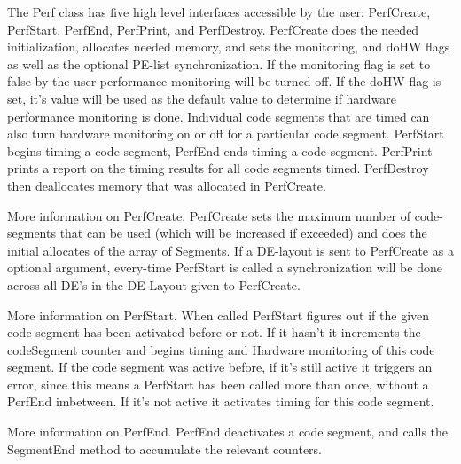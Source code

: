 %


The Perf class has five high level interfaces accessible by the user:
PerfCreate, PerfStart, PerfEnd, PerfPrint, and PerfDestroy. PerfCreate does the needed
initialization, allocates needed memory, and sets the monitoring, and doHW 
flags as well as the optional PE-list synchronization. If the monitoring flag is 
set to false by the user performance monitoring 
will be turned off. If the doHW flag is set, it's value will be used as the 
default value to determine if hardware performance monitoring is done. Individual code
segments that are timed can also turn hardware monitoring on or off for
a particular code segment. PerfStart begins timing a code segment, PerfEnd
ends timing a code segment. PerfPrint prints a report on the timing results
for all code segments timed. PerfDestroy then deallocates memory that was
allocated in PerfCreate.

More information on PerfCreate. PerfCreate sets the maximum number of code-segments
that can be used (which will be increased if exceeded) and does the initial
allocates of the array of Segments. If a DE-layout is sent to PerfCreate as a
optional argument, every-time PerfStart is called a synchronization will be done
across all DE's in the DE-Layout given to PerfCreate.

More information on PerfStart. When called PerfStart figures out if the given
code segment has been activated before or not. If it hasn't it increments
the codeSegment counter and begins timing and Hardware monitoring of this
code segment. If the code segment was active before, if it's still active
it triggers an error, since this means a PerfStart has been called more than
once, without a PerfEnd imbetween. If it's not active it activates timing
for this code segment.

More information on PerfEnd. PerfEnd deactivates a code segment, and calls
the SegmentEnd method to accumulate the relevant counters.

